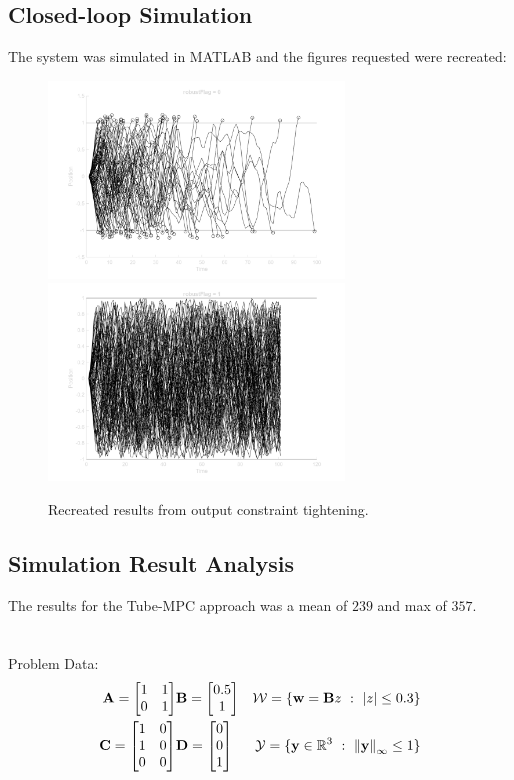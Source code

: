 \documentclass[]{article}
\newcommand{\R}{\mathbb{R}}
\newcommand{\st}{\ : \ }
\begin{document}
\subsection{Closed-loop Simulation}
The system was simulated in MATLAB and the figures requested were recreated:
\begin{figure}[h]
    \centering
    \includegraphics[width=0.7\textwidth]{figs/pblm1_robust=0.png}\\
    \includegraphics[width=0.7\textwidth]{figs/pblm1_robust=1.png}\
    \caption{Recreated results from output constraint tightening.}
\end{figure}

\subsection{Simulation Result Analysis}
The results for the Tube-MPC approach was a mean of $239$ and max of $357$.

\newpage
\section{}
Problem Data:
\begin{equation}
    \begin{aligned}
        \mathbf{A} = \mqty[1&1\\0&1] & \mathbf{B} = \mqty[0.5\\1] & \mathcal{W} = \{\vb{w} = \mathbf{B} z \st \abs{z} \leq 0.3\}\\
        \mathbf{C} = \mqty[1&0\\1&0\\0&0] & \mathbf{D} = \mqty[0\\0\\1] & \mathcal{Y} = \{\vb{y} \in \R^3 \st \norm{\vb{y}}_{\infty} \leq 1\}
    \end{aligned}
\end{equation}
\end{document}
